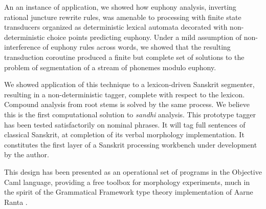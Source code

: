 An an instance of application, we showed how euphony analysis, inverting
rational juncture rewrite rules, was amenable to processing with 
finite state transducers organized as deterministic lexical automata decorated
with non-deterministic choice points predicting euphony. 
Under a mild assumption of non-interference of euphony rules across words, 
we showed that the resulting transduction coroutine 
produced a finite but complete set of solutions to
the problem of segmentation of a stream of phonemes modulo euphony. 

We showed application of this technique to a lexicon-driven Sanskrit 
segmenter, resulting in a non-deterministic tagger, complete with respect
to the lexicon. Compound analysis from root stems is solved by the
same process. We believe this is the first computational solution to
{\sl sandhi} analysis. This prototype tagger has been tested 
satisfactorily on nominal phrases. It will tag full sentences of
classical Sanskrit, at completion of its verbal morphology implementation. 
It constitutes the first layer of a Sanskrit processing workbench under 
development by the author. 

This design has been presented as an operational set of programs in
the Objective Caml language, providing a free toolbox for morphology
experiments, much in the spirit of the Grammatical Framework type
theory implementation of Aarne Ranta \cite{ranta}.

